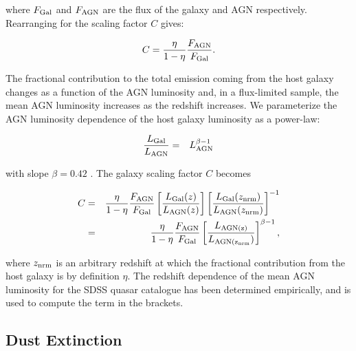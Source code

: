 where $F_{\rm Gal}$ and $F_{\rm AGN}$ are the flux of the galaxy and \ac{AGN} respectively. 
Rearranging for the scaling factor $C$ gives:

\begin{eqnarray}
  C = \frac{\eta}{1 - \eta} \frac{F_{\rm AGN}}{F_{\rm Gal}}.
\end{eqnarray}

The fractional contribution to the total emission coming from the host galaxy changes as a function of the \ac{AGN} luminosity and, in a flux-limited sample, the mean \ac{AGN} luminosity increases as the redshift increases. 
We parameterize the \ac{AGN} luminosity dependence of the host galaxy luminosity as a power-law:

\begin{eqnarray}
  \label{eq:lgal}
  \frac{L_{\rm Gal}}{L_{\rm AGN}} &=& L_{\rm AGN}^{\beta - 1} 
\end{eqnarray}

with slope $\beta=0.42$ \citep{maddox06}. 
The galaxy scaling factor $C$ becomes 

\begin{eqnarray}
  C &=& \frac{\eta}{1 - \eta} \frac{F_{\rm AGN}}{F_{\rm Gal}} \left[ \frac{ L_{\rm Gal}(z)} {L_{\rm AGN}(z)} \right] \left[ \frac{ L_{\rm Gal}(z_{\rm nrm})} {L_{\rm AGN}(z_{\rm nrm})} \right]^{-1} \\
  &=& \frac{\eta}{1 - \eta} \frac{F_{\rm AGN}}{F_{\rm Gal}} \left[ \frac{L_{\rm AGN(z)}} {L_{\rm AGN(z_{\rm nrm}})} \right]^{\beta -1}, 
\end{eqnarray}

where $z_{\rm nrm}$ is an arbitrary redshift at which the fractional contribution from the host galaxy is by definition $\eta$. 
The redshift dependence of the mean \ac{AGN} luminosity for the SDSS quasar catalogue has been determined empirically, and is used to compute the term in the brackets. 

\subsection{Dust Extinction}
\label{sec:sed-extinction} 

